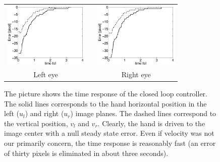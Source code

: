 \begin{figure}
  \begin{center}
	\begin{tabular}{ccc}
	  \parbox{40mm}{\includegraphics[width=40mm]{Figure/TimeReponseLeftClosedLoop.eps}}  & \hspace{2cm} &
	  \parbox{40mm}{\includegraphics[width=40mm]{Figure/TimeReponseRightClosedLoop.eps}}
	  \\
	  \parbox{40mm}{\centering Left eye } & \hspace{2cm} & \parbox{40mm}{\centering Right eye }
  \end{tabular}
\end{center}
\caption{The picture shows the time response of the closed loop controller. The solid lines corresponds to the hand horizontal position in the left ($u_l$) and right ($u_r$) image planes. The dashed lines correspond to the vertical position, $v_l$ and $v_r$. Clearly, the hand is driven to the image center with a null steady state error. Even if velocity was not our primarily concern, the time response is reasonably fast (an error of thirty pixels is eliminated in about 
three seconds). }\label{Fig:TimeResponseClosedLoopErrors}
  \end{figure}


